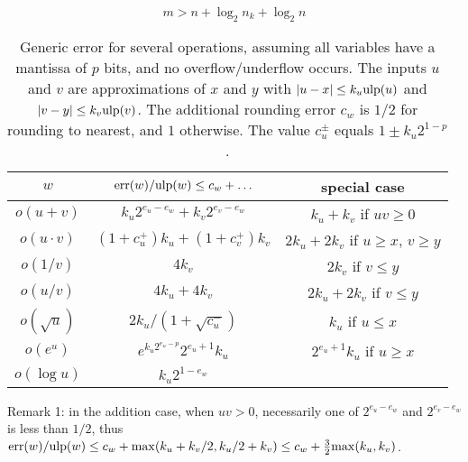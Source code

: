 \documentclass[12pt]{amsart}
\def\ulp{{\rm ulp}}
\def\err{{\rm err}}
\begin{document}
\[
m > n + \log_2 n_k + \log_2 n
\]

\begin{table}
\begin{center}
\begin{tabular}{|c|c|c|} \hline
   $w$        & $\err(w)/\ulp(w) \le c_w + \ldots$ &special case\\ \hline\hline
$o(u+v)$ & $k_u 2^{e_u-e_w} + k_v 2^{e_v-e_w}$ & $k_u + k_v$ if $u v \ge 0$\\
$o(u \cdot v)$ & $(1+c^{+}_u)k_u + (1+c^{+}_v)k_v$ & $2k_u + 2k_v$ if $u \ge x$, $v \ge y$\\
$o(1/v)$ & $4 k_v$ & $2 k_v$ if $v \le y$ \\
$o(u/v)$ & $4 k_u + 4 k_v$ & $2 k_u + 2 k_v$ if $v \le y$ \\
$o(\sqrt{u})$ & $2 k_u/(1+\sqrt{c^{-}_u})$ & $k_u$ if $u \le x$ \\
$o(e^u)$ & $e^{k_u 2^{e_u-p}} 2^{e_u+1} k_u$ & $2^{e_u+1} k_u$ if $u \ge x$ \\
$o(\log u)$ & $k_u 2^{1-e_w}$ & \\
\hline
\end{tabular}
\end{center}
\caption{Generic error for several operations, assuming all variables have a
mantissa of $p$ bits, and no overflow/underflow occurs.
The inputs $u$ and $v$ are
approximations of $x$ and $y$ with $|u-x| \le k_u \ulp(u)$ and 
$|v-y| \le k_v \ulp(v)$. The additional rounding error $c_w$ is $1/2$ for
rounding to nearest, and $1$ otherwise.
The value $c^{\pm}_u$ equals $1 \pm k_u 2^{1-p}$.
}
\end{table}
Remark 1: in the addition case, when $u v > 0$,
necessarily one of $2^{e_u-e_w}$ and $2^{e_v-e_w}$ is less than $1/2$,
thus $\err(w)/\ulp(w) \le c_w + {\rm max}(k_u + k_v/2, k_u/2 + k_v)
	\le c_w + \frac{3}{2} {\rm max}(k_u, k_v)$.

\nocite{BoBo98,DeHi02}



\end{document}
